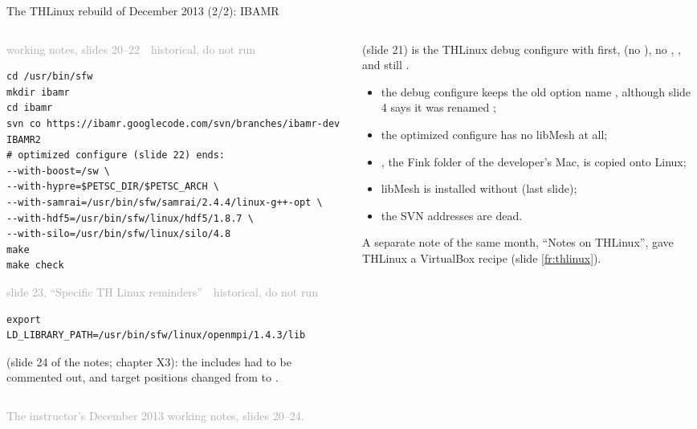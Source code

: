 \documentclass[aspectratio=169,11pt]{beamer}
\newcommand{\sourcecredit}[1]{\vfill\begin{flushright}\tiny\textcolor{DarkGray}{#1}\end{flushright}}
\newcommand{\hist}[1]{{\tiny\sffamily\textcolor{DarkGray}{#1\ \textbullet\ historical, do not run}}\par\nointerlineskip\vspace{0.3mm}}
\begin{document}
\begin{frame}[fragile]{The THLinux rebuild of December 2013 (2/2): IBAMR }
\label{fr:th2013b}
\begin{columns}[T,onlytextwidth]
\begin{column}{0.48\textwidth}
\hist{working notes, slides 20--22}
\begin{lstlisting}[style=hist]
cd /usr/bin/sfw
mkdir ibamr
cd ibamr
svn co https://ibamr.googlecode.com/svn/branches/ibamr-dev IBAMR2
# optimized configure (slide 22) ends:
--with-boost=/sw \
--with-hypre=$PETSC_DIR/$PETSC_ARCH \
--with-samrai=/usr/bin/sfw/samrai/2.4.4/linux-g++-opt \
--with-hdf5=/usr/bin/sfw/linux/hdf5/1.8.7 \
--with-silo=/usr/bin/sfw/linux/silo/4.8
make
make check
\end{lstlisting}
\hist{slide 23, ``Specific TH Linux reminders''}
\begin{lstlisting}[style=hist]
export LD_LIBRARY_PATH=/usr/bin/sfw/linux/openmpi/1.4.3/lib
\end{lstlisting}
\scriptsize \al{Code that broke with it} (slide 24 of the notes; chapter X3): the  includes had to be commented out, and target positions changed from  to .
\end{column}
\begin{column}{0.49\textwidth}
\scriptsize {} (slide 21) is the THLinux debug configure with  first,  (no ), no , , and still  .

\vspace{1mm}
\begin{itemize}\setlength{\itemsep}{2pt}
  \item the debug configure keeps the old option name , although slide 4 says it was renamed ;
  \item the optimized configure has no libMesh at all;
  \item \code{--with-boost=/sw}, the Fink folder of the developer's Mac, is copied onto Linux;
  \item libMesh is installed without  (last slide);
  \item the SVN addresses are dead.
\end{itemize}
\vspace{1mm}
A separate note of the same month, ``Notes on THLinux'', gave THLinux a VirtualBox recipe (slide \ref{fr:thlinux}).
\end{column}
\end{columns}
\sourcecredit{The instructor's December 2013 working notes, slides 20--24.}
\end{frame}
\end{document}
